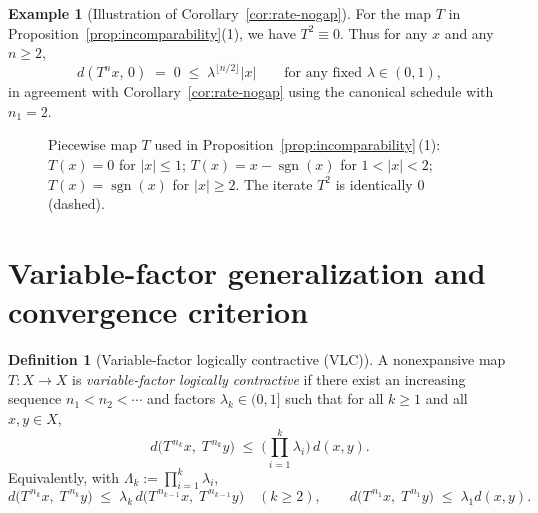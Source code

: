 \documentclass[11pt]{article}
\theoremstyle{definition}
\newtheorem{definition}[theorem]{Definition}
\newtheorem{example}[theorem]{Example}
\theoremstyle{remark}
\DeclareMathOperator{\sgn}{sgn}
\begin{document}
\begin{example}[Illustration of Corollary~\ref{cor:rate-nogap}]\label{ex:T-square}
For the map $T$ in Proposition~\ref{prop:incomparability}(1), we have $T^2\equiv 0$. Thus for any $x$ and any $n\ge 2$,
\[
d(T^n x,\,0)\;=\;0\;\le\; \lambda^{\lfloor n/2\rfloor} |x| \qquad\text{for any fixed }\lambda\in(0,1),
\]
in agreement with Corollary~\ref{cor:rate-nogap} using the canonical schedule with $n_1=2$.
\end{example}

\begin{figure}[t]
\centering
{}
\caption{Piecewise map $T$ used in Proposition~\ref{prop:incomparability}\,(1): $T(x)=0$ for $|x|\le 1$; $T(x)=x-\sgn(x)$ for $1<|x|<2$; $T(x)=\sgn(x)$ for $|x|\ge 2$. The iterate $T^2$ is identically $0$ (dashed).}
\label{fig:example}
\end{figure}

\section{Variable-factor generalization and convergence criterion}
\begin{definition}[Variable-factor logically contractive (VLC)]\label{def:vlc}
A nonexpansive map $T:X\to X$ is \emph{variable-factor logically contractive} if there exist an increasing sequence $n_1<n_2<\cdots$ and factors $\lambda_k\in(0,1]$ such that for all $k\ge 1$ and all $x,y\in X$,
\[
d\!\big(T^{\,n_k}x,\;T^{\,n_k}y\big)\;\le\;\Big(\prod_{i=1}^{k}\lambda_i\Big)\, d(x,y).
\]
Equivalently, with $\Lambda_k:=\prod_{i=1}^{k}\lambda_i$,
\[
d\!\big(T^{\,n_k}x,\;T^{\,n_k}y\big)\;\le\;\lambda_k\, d\!\big(T^{\,n_{k-1}}x,\;T^{\,n_{k-1}}y\big)\quad(k\ge 2),\qquad
d\!\big(T^{\,n_1}x,\;T^{\,n_1}y\big)\;\le\;\lambda_1 d(x,y).
\]
\end{definition}
\end{document}

